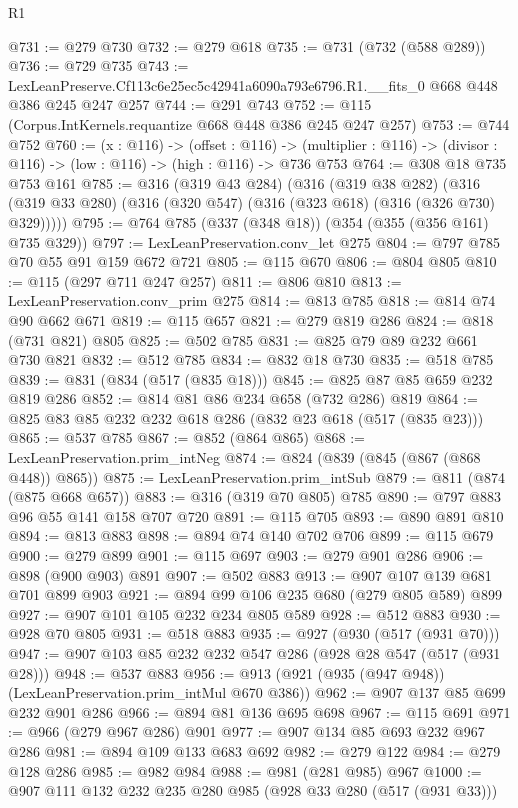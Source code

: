 \begin{lexlean}{R1}
\begin{coremodule}
@731 := @279 @730
@732 := @279 @618
@735 := @731 (@732 (@588 @289))
@736 := @729 @735
@743 := LexLeanPreserve.Cf113c6e25ec5c42941a6090a793e6796.R1.__fits_0 @668 @448 @386 @245 @247 @257
@744 := @291 @743
@752 := @115 (Corpus.IntKernels.requantize @668 @448 @386 @245 @247 @257)
@753 := @744 @752
@760 := (x : @116) ->
  (offset : @116) ->
  (multiplier : @116) -> (divisor : @116) -> (low : @116) -> (high : @116) -> @736 @753
@764 := @308 @18 @735 @753 @161
@785 := @316
    (@319 @43 @284)
    (@316
      (@319 @38 @282)
      (@316 (@319 @33 @280) (@316 (@320 @547) (@316 (@323 @618) (@316 (@326 @730) @329)))))
@795 := @764 @785 (@337 (@348 @18)) (@354 (@355 (@356 @161) @735 @329))
@797 := LexLeanPreservation.conv_let @275
@804 := @797 @785 @70 @55 @91 @159 @672 @721
@805 := @115 @670
@806 := @804 @805
@810 := @115 (@297 @711 @247 @257)
@811 := @806 @810
@813 := LexLeanPreservation.conv_prim @275
@814 := @813 @785
@818 := @814 @74 @90 @662 @671
@819 := @115 @657
@821 := @279 @819 @286
@824 := @818 (@731 @821) @805
@825 := @502 @785
@831 := @825 @79 @89 @232 @661 @730 @821
@832 := @512 @785
@834 := @832 @18 @730
@835 := @518 @785
@839 := @831 (@834 (@517 (@835 @18)))
@845 := @825 @87 @85 @659 @232 @819 @286
@852 := @814 @81 @86 @234 @658 (@732 @286) @819
@864 := @825 @83 @85 @232 @232 @618 @286 (@832 @23 @618 (@517 (@835 @23)))
@865 := @537 @785
@867 := @852 (@864 @865)
@868 := LexLeanPreservation.prim_intNeg
@874 := @824 (@839 (@845 (@867 (@868 @448)) @865))
@875 := LexLeanPreservation.prim_intSub
@879 := @811 (@874 (@875 @668 @657))
@883 := @316 (@319 @70 @805) @785
@890 := @797 @883 @96 @55 @141 @158 @707 @720
@891 := @115 @705
@893 := @890 @891 @810
@894 := @813 @883
@898 := @894 @74 @140 @702 @706
@899 := @115 @679
@900 := @279 @899
@901 := @115 @697
@903 := @279 @901 @286
@906 := @898 (@900 @903) @891
@907 := @502 @883
@913 := @907 @107 @139 @681 @701 @899 @903
@921 := @894 @99 @106 @235 @680 (@279 @805 @589) @899
@927 := @907 @101 @105 @232 @234 @805 @589
@928 := @512 @883
@930 := @928 @70 @805
@931 := @518 @883
@935 := @927 (@930 (@517 (@931 @70)))
@947 := @907 @103 @85 @232 @232 @547 @286 (@928 @28 @547 (@517 (@931 @28)))
@948 := @537 @883
@956 := @913 (@921 (@935 (@947 @948)) (LexLeanPreservation.prim_intMul @670 @386))
@962 := @907 @137 @85 @699 @232 @901 @286
@966 := @894 @81 @136 @695 @698
@967 := @115 @691
@971 := @966 (@279 @967 @286) @901
@977 := @907 @134 @85 @693 @232 @967 @286
@981 := @894 @109 @133 @683 @692
@982 := @279 @122
@984 := @279 @128 @286
@985 := @982 @984
@988 := @981 (@281 @985) @967
@1000 := @907 @111 @132 @232 @235 @280 @985 (@928 @33 @280 (@517 (@931 @33)))

\end{coremodule}
\end{lexlean}
